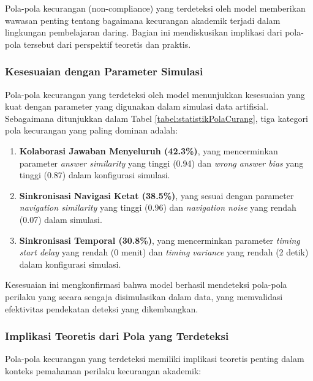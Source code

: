 Pola-pola kecurangan (non-compliance) yang terdeteksi oleh model memberikan wawasan penting tentang bagaimana kecurangan akademik terjadi dalam lingkungan pembelajaran daring. Bagian ini mendiskusikan implikasi dari pola-pola tersebut dari perspektif teoretis dan praktis.

\subsubsection{Kesesuaian dengan Parameter Simulasi}

Pola-pola kecurangan yang terdeteksi oleh model menunjukkan kesesuaian yang kuat dengan parameter yang digunakan dalam simulasi data artifisial. Sebagaimana ditunjukkan dalam Tabel \ref{tabel:statistikPolaCurang}, tiga kategori pola kecurangan yang paling dominan adalah:

\begin{enumerate}
    \item \textbf{Kolaborasi Jawaban Menyeluruh (42.3\%)}, yang mencerminkan parameter \textit{answer similarity} yang tinggi (0.94) dan \textit{wrong answer bias} yang tinggi (0.87) dalam konfigurasi simulasi.
    
    \item \textbf{Sinkronisasi Navigasi Ketat (38.5\%)}, yang sesuai dengan parameter \textit{navigation similarity} yang tinggi (0.96) dan \textit{navigation noise} yang rendah (0.07) dalam simulasi.
    
    \item \textbf{Sinkronisasi Temporal (30.8\%)}, yang mencerminkan parameter \textit{timing start delay} yang rendah (0 menit) dan \textit{timing variance} yang rendah (2 detik) dalam konfigurasi simulasi.
\end{enumerate}

Kesesuaian ini mengkonfirmasi bahwa model berhasil mendeteksi pola-pola perilaku yang secara sengaja disimulasikan dalam data, yang memvalidasi efektivitas pendekatan deteksi yang dikembangkan.

\subsubsection{Implikasi Teoretis dari Pola yang Terdeteksi}

Pola-pola kecurangan yang terdeteksi memiliki implikasi teoretis penting dalam konteks pemahaman perilaku kecurangan akademik:

